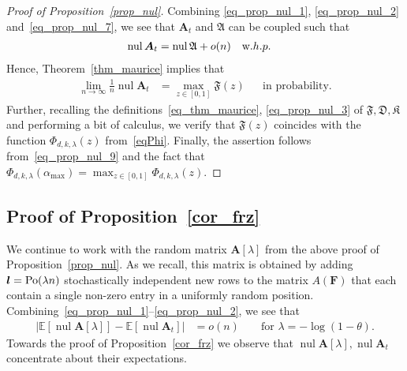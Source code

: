 \documentclass[10pt,reqno]{amsart}
\numberwithin{equation}{section}
\renewcommand{\vec}[1]{\boldsymbol{#1}}
\newcommand{\amax}{\alpha_{\max}}
\newcommand\PHI{\vec F}
\newcommand\fA{\mathfrak A}
\newcommand\fD{\mathfrak D}
\newcommand\fF{\mathfrak F}
\newcommand\fK{\mathfrak K}
\newcommand\vA{\vec A}
\newcommand\vl{\vec l}
\newcommand\Erw{\mathbb{E}}
\newcommand\ex{\Erw}
\newcommand{\Po}{{\rm Po}}
\newcommand\abs[1]{\left|{#1}\right|}
\newcommand{\whp}{w.h.p.}
\newcommand\Prop{Proposition}
\newcommand\Thm{Theorem}
\DeclareMathOperator{\nul}{nul}
\newcommand{\Ph}{\Phi_{d,k,\lambda}}
\begin{document}
\begin{proof}[Proof of \Prop~\ref{prop_nul}]
	Combining \eqref{eq_prop_nul_1}, \eqref{eq_prop_nul_2} and~\eqref{eq_prop_nul_7}, we see that $\vA_t$ and $\fA$ can be coupled such that 
	\begin{align}\label{eq_prop_nul_8}
		\nul\vA_t&=\nul\fA+o(n)&&\mbox\whp
	\end{align}
	Hence, \Thm~\ref{thm_maurice} implies that
	\begin{align}\label{eq_prop_nul_9}
		\lim_{n\to\infty}\frac1n\nul\vA_t&=\max_{z\in[0,1]}\fF(z)&&\mbox{in probability}.
	\end{align}
	Further, recalling the definitions~\eqref{eq_thm_maurice}, \eqref{eq_prop_nul_3} of $\fF,\fD,\fK$ and performing a bit of calculus, we verify that $\fF(z)$ coincides with the function $\Ph(z)$ from~\eqref{eqPhi}.
	Finally, the assertion follows from~\eqref{eq_prop_nul_9} and the fact that $\Ph(\amax)=\max_{z\in[0,1]}\Ph(z)$.
\end{proof}


\subsection{Proof of \Prop~\ref{cor_frz}}\label{sec_cor_frz}
We continue to work with the random matrix $\vA[\lambda]$ from the above proof of \Prop~\ref{prop_nul}.
As we recall, this matrix is obtained by adding $\vl=\Po(\lambda n)$ stochastically independent new rows to the matrix $A(\PHI)$ that each contain a single non-zero entry in a uniformly random position.
Combining~\eqref{eq_prop_nul_1}--\eqref{eq_prop_nul_2}, we see that
\begin{align}\label{eqAA}
	\abs{\ex[\nul\vA[\lambda]]-\ex[\nul\vA_t]}&=o(n)&&\mbox{ for }\lambda=-\log(1-\theta).
\end{align}
Towards the proof of \Prop~\ref{cor_frz} we observe that $\nul\vA[\lambda],\nul\vA_t$ concentrate about their expectations.
\end{document}
